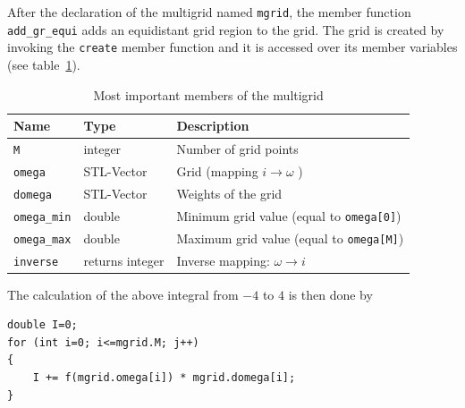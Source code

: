 \vspace{1cm}
After the declaration of the multigrid named \texttt{mgrid}, the member function \texttt{add\_gr\_equi} adds an equidistant grid region to the grid. The grid is created by invoking the \texttt{create} member function and it is accessed over its member variables (see table~\ref{tab:member}). 



\begin{table}[h]
	\begin{center}
		\begin{tabular}{l|l|l}\hline
		Name & Type & Description \\ \hline
		\texttt{M} & integer & Number of grid points\\\hline
		\texttt{omega} & STL-Vector & Grid (mapping $i\to\omega$ )\\\hline
		\texttt{domega} & STL-Vector & Weights of the grid\\\hline
		\texttt{omega\_min} & double & Minimum grid value (equal to \texttt{omega[0]}) \\\hline
		\texttt{omega\_max} & double & Maximum grid value (equal to \texttt{omega[M]}) \\\hline
		\texttt{inverse} & returns integer & Inverse mapping: $\omega\to i$ \\\hline
		\end{tabular}
	\end{center}
	\caption{Most important members of the multigrid}
	\label{tab:member}
\end{table}

The calculation of the above integral from $-4$ to $4$ is then done by

\begin{lstlisting}
double I=0;
for (int i=0; i<=mgrid.M; j++)
{
	I += f(mgrid.omega[i]) * mgrid.domega[i];
}
\end{lstlisting}

